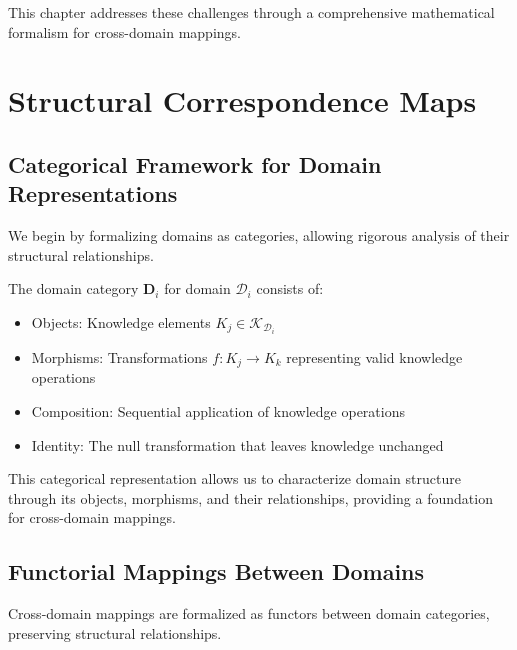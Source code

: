 This chapter addresses these challenges through a comprehensive mathematical formalism for cross-domain mappings.

\section{Structural Correspondence Maps}

\subsection{Categorical Framework for Domain Representations}

We begin by formalizing domains as categories, allowing rigorous analysis of their structural relationships.

\begin{definition}
The domain category $\mathbf{D}_i$ for domain $\mathcal{D}_i$ consists of:
\begin{itemize}
    \item Objects: Knowledge elements $K_j \in \mathcal{K}_{\mathcal{D}_i}$
    \item Morphisms: Transformations $f: K_j \rightarrow K_k$ representing valid knowledge operations
    \item Composition: Sequential application of knowledge operations
    \item Identity: The null transformation that leaves knowledge unchanged
\end{itemize}
\end{definition}

This categorical representation allows us to characterize domain structure through its objects, morphisms, and their relationships, providing a foundation for cross-domain mappings.

\subsection{Functorial Mappings Between Domains}

Cross-domain mappings are formalized as functors between domain categories, preserving structural relationships.

